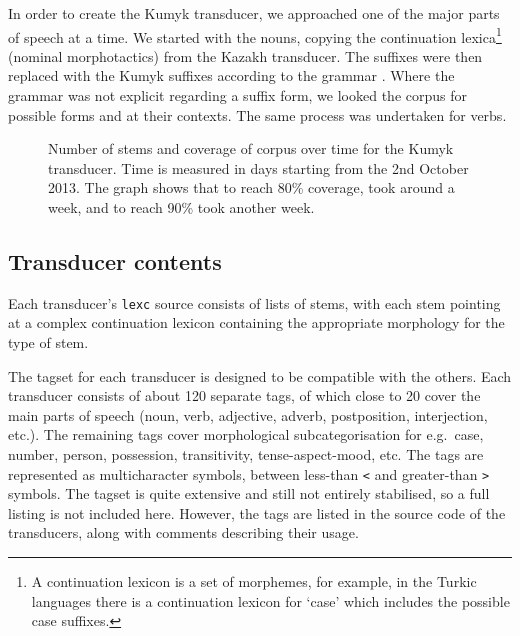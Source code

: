 \documentclass[a4paper,11pt,twocolumn]{article}
\begin{document}
In order to create the Kumyk transducer, we approached one of the major parts of speech at a time. We started with the nouns, copying the 
continuation lexica\footnote{A continuation lexicon is a set of morphemes, for example, in the Turkic languages there is a continuation lexicon for `case' which includes the possible case suffixes.} (nominal morphotactics) from the Kazakh transducer. The suffixes were then replaced with the Kumyk suffixes according to the grammar \citep{olmesov2000}. Where the grammar was not explicit regarding a suffix form, we looked the corpus for possible forms and at their contexts. The same process was undertaken for verbs. 


\begin{figure}
\hspace{-15pt}

\caption{Number of stems and coverage of corpus over time for the Kumyk transducer. Time is measured in days 
starting from the 2nd October 2013. The graph shows that to reach 80\% coverage, took
around a week, and to reach 90\% took another week.}
\label{fig:kumcov}
\end{figure}

\subsection{Transducer contents}

Each transducer's \texttt{lexc} source consists of lists of stems, with each stem pointing at a complex continuation lexicon containing the appropriate morphology for the type of stem.  

The tagset for each transducer is designed to be compatible with the others.  Each transducer consists of about 120 separate tags, of which close to 20 cover the main parts of speech (noun, verb, adjective, adverb, postposition, interjection, etc.).  The remaining tags cover morphological subcategorisation for e.g.\ case, number, person, possession, transitivity, tense-aspect-mood, etc.  The tags are represented as multicharacter symbols, between less-than \texttt{<} and greater-than \texttt{>} symbols.  The tagset is quite extensive and still not entirely stabilised, so a full listing is not included here.  However, the tags are listed in the source code of the transducers, along with comments describing their usage.
\end{document}
